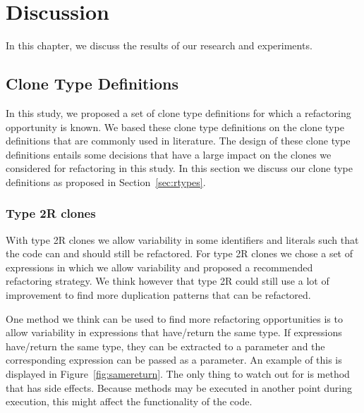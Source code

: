 \chapter{Discussion}
\label{ch:discussion}

In this chapter, we discuss the results of our research and experiments.

\section{Clone Type Definitions}
In this study, we proposed a set of clone type definitions for which a refactoring opportunity is known.
We based these clone type definitions on the clone type definitions that are commonly used in literature. The design of these clone type definitions entails some decisions that have a large impact on the clones we considered for refactoring in this study. In this section we discuss our clone type definitions as proposed in Section~\ref{sec:rtypes}.

\subsection{Type 2R clones}
With type 2R clones we allow variability in some identifiers and literals such that the code can and should still be refactored. For type 2R clones we chose a set of expressions in which we allow variability and proposed a recommended refactoring strategy. We think however that type 2R could still use a lot of improvement to find more duplication patterns that can be refactored.

One method we think can be used to find more refactoring opportunities is to allow variability in expressions that have/return the same type. If expressions have/return the same type, they can be extracted to a parameter and the corresponding expression can be passed as a parameter. An example of this is displayed in Figure~\ref{fig:samereturn}. The only thing to watch out for is method that has side effects. Because methods may be executed in another point during execution, this might affect the functionality of the code.

